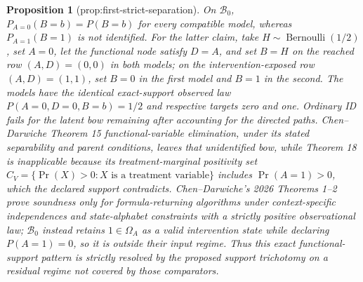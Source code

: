 \documentclass{article}
\newtheorem{proposition}{Proposition}
\begin{document}
\begin{proposition}[prop:first-strict-separation]\label{prop:first-strict-separation}
On \(\mathcal B_0\), \(P_{A=0}(B=b)=P(B=b)\) for every compatible model, whereas \(P_{A=1}(B=1)\) is not identified. For the latter claim, take \(H\sim\operatorname{Bernoulli}(1/2)\), set \(A=0\), let the functional node satisfy \(D=A\), and set \(B=H\) on the reached row \((A,D)=(0,0)\) in both models; on the intervention-exposed row \((A,D)=(1,1)\), set \(B=0\) in the first model and \(B=1\) in the second. The models have the identical exact-support observed law \(P(A=0,D=0,B=b)=1/2\) and respective targets zero and one. Ordinary ID fails for the latent bow remaining after accounting for the directed paths. Chen--Darwiche Theorem 15 functional-variable elimination, under its stated separability and parent conditions, leaves that unidentified bow, while Theorem 18 is inapplicable because its treatment-marginal positivity set \(C_V=\{\Pr(X)>0:X\text{ is a treatment variable}\}\) includes \(\Pr(A=1)>0\), which the declared support contradicts. Chen--Darwiche's 2026 Theorems 1--2 prove soundness only for formula-returning algorithms under context-specific independences and state-alphabet constraints with a strictly positive observational law; \(\mathcal B_0\) instead retains \(1\in\Omega_A\) as a valid intervention state while declaring \(P(A=1)=0\), so it is outside their input regime. Thus this exact functional-support pattern is strictly resolved by the proposed support trichotomy on a residual regime not covered by those comparators.
\end{proposition}
\end{document}

